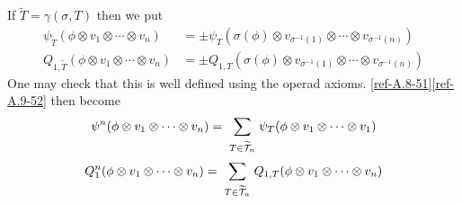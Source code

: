 \documentclass{amsart}
\numberwithin{equation}{section}
\let\cal\mathcal
\theoremstyle{definition}
\theoremstyle{remark}
\begin{document}
If $\tilde{T}=\gamma(\sigma,T)$ then we put
\begin{align*}
\psi_{\tilde{T}}(\phi\otimes v_1\otimes\cdots\otimes  
v_n)&=\pm\psi_{T}(\sigma(\phi)\otimes v_{\sigma^{-1}(1)}\otimes
\cdots
\otimes
v_{\sigma^{-1}(n)})\\
Q_{1,\tilde{T}}(\phi\otimes v_1\otimes\cdots\otimes  
v_n)&=\pm Q_{1,T}(\sigma(\phi)\otimes v_{\sigma^{-1}(1)}\otimes
\cdots
\otimes
v_{\sigma^{-1}(n)})
\end{align*}
One may check that this is well defined using the operad axioms.
\eqref{ref-A.8-51}\eqref{ref-A.9-52} then become
\[
\psi^n(\phi\otimes v_1\otimes \cdots\otimes v_n)=\\
\sum_{\begin{smallmatrix}
\\ T\in \widetilde{{\cal T}}_n\end{smallmatrix}}
\psi_T(\phi\otimes v_{1}\otimes\cdots\otimes  
v_{1})
\]
\[
Q^n_1(\phi\otimes v_1\otimes \cdots\otimes v_n)=\\
\sum_{\begin{smallmatrix}
\\ T\in \widetilde{{\cal T}}_n\end{smallmatrix}}
Q_{1,T}(\phi\otimes v_{1}\otimes\cdots\otimes  
v_{n})
\]
\end{document}
